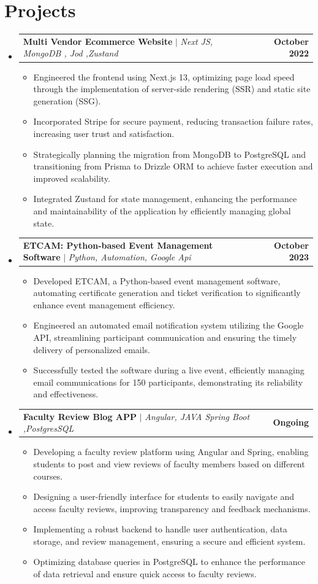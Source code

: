 \documentclass[letterpaper,10.9pt]{article}
\makeatletter
\newcommand{\resumeItem}[1]{
  \item\small{
    {#1 \vspace{-2pt}}
  }
}
\newcommand{\resumeProjectHeading}[2]{
    \item
    \begin{tabular*}{1.001\textwidth}{l@{\extracolsep{\fill}}r}
      \small#1 & \textbf{\small #2}\\
    \end{tabular*}\vspace{-7pt}
}
\newcommand{\resumeSubHeadingListStart}{\begin{itemize}[leftmargin=0.0in, label={}]}
\newcommand{\resumeSubHeadingListEnd}{\end{itemize}}
\newcommand{\resumeItemListStart}{\begin{itemize}}
\newcommand{\resumeItemListEnd}{\end{itemize}\vspace{-7pt}}
\makeatother
\begin{document}
\section{Projects}
    \vspace{-5pt}
    \resumeSubHeadingListStart
    \resumeProjectHeading
        {\textbf{Multi Vendor Ecommerce Website} $|$ \emph{Next JS, MongoDB , Jod ,Zustand}}{October 2022}
        \resumeItemListStart
        \resumeItem{\raggedright Engineered the frontend using Next.js 13, optimizing page load speed through the implementation of server-side rendering (SSR) and static site generation (SSG).}
        \resumeItem{\raggedright Incorporated Stripe for secure payment, reducing transaction failure rates, increasing user trust and satisfaction.}
        \resumeItem{\raggedright Strategically planning the migration from MongoDB to PostgreSQL and transitioning from Prisma to Drizzle ORM to achieve faster execution and improved scalability.}
        \resumeItem{\raggedright Integrated Zustand for state management, enhancing the performance and maintainability of the application by efficiently managing global state.}
    \resumeItemListEnd
    \vspace{-13pt}
      \resumeProjectHeading
          {\textbf{ETCAM: Python-based Event Management Software} $|$ \emph{Python, Automation, Google Api}}{October 2023}
          \resumeItemListStart
          \resumeItem{\raggedright Developed ETCAM, a Python-based event management software, automating certificate generation and ticket verification to significantly enhance event management efficiency.}
          \resumeItem{\raggedright Engineered an automated email notification system utilizing the Google API, streamlining participant communication and ensuring the timely delivery of personalized emails.}
          \resumeItem{\raggedright Successfully tested the software during a live event, efficiently managing email communications for 150 participants, demonstrating its reliability and effectiveness.}
      \resumeItemListEnd
      \vspace{-14pt}
      \resumeProjectHeading
        {\textbf{Faculty Review Blog APP} $|$ \emph{Angular, JAVA Spring Boot ,PostgresSQL}}{Ongoing}
        \resumeItemListStart
        \resumeItem{\raggedright Developing a faculty review platform using Angular and Spring, enabling students to post and view reviews of faculty members based on different courses.}
        \resumeItem{\raggedright Designing a user-friendly interface for students to easily navigate and access faculty reviews, improving transparency and feedback mechanisms.}
        \resumeItem{\raggedright Implementing a robust backend to handle user authentication, data storage, and review management, ensuring a secure and efficient system.}
        \resumeItem{\raggedright Optimizing database queries in PostgreSQL to enhance the performance of data retrieval and ensure quick access to faculty reviews.}
    \resumeItemListEnd
    \resumeSubHeadingListEnd
    \vspace{-13pt}
\end{document}
